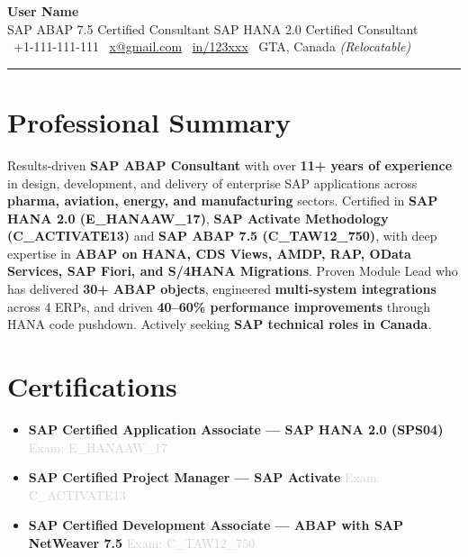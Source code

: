 \documentclass[10pt, a4paper]{article}
\makeatletter
\newcommand{\UserName}{User Name}
\newcommand{\UserMobile}{+1-111-111-111}
\newcommand{\UserEmailID}{x@gmail.com}
\newcommand{\UserLinkedIn}{\href{https://www.linkedin.com/in/123xxx}{in/123xxx}}
\makeatother
\begin{document}
\begin{center}
  {\LARGE\bfseries \UserName{}}\\[5pt]
  {\large\color{accentblue}
    SAP ABAP 7.5 Certified Consultant \quad\textbar\quad
    SAP HANA 2.0 Certified Consultant
  }\\[6pt]
  \textcolor{iconcolor}{%
    \faPhone*\ \UserMobile{} \quad\textbar\quad
    \faEnvelope\ \href{mailto:\UserEmailID{}}{\UserEmailID{}} \quad\textbar\quad
    \faLinkedin\ \UserLinkedIn{} \quad\textbar\quad
    \faMapPin\ GTA, Canada \textit{(Relocatable)}
  }
\end{center}
\vspace{2pt}\rule{\linewidth}{1.2pt}\vspace{4pt}

\section{Professional Summary}
Results-driven \textbf{SAP ABAP Consultant} with over \textbf{11+ years of experience}
in design, development, and delivery of enterprise SAP applications across
\textbf{pharma, aviation, energy, and manufacturing} sectors. Certified in
\textbf{SAP HANA 2.0 (E\_HANAAW\_17)}, \textbf{SAP Activate Methodology (C\_ACTIVATE13)} and
\textbf{SAP ABAP 7.5 (C\_TAW12\_750)}, with deep expertise in
\textbf{ABAP on HANA, CDS Views, AMDP, RAP, OData Services,
SAP Fiori, and S/4HANA Migrations}. Proven Module Lead who has delivered
\textbf{30+ ABAP objects}, engineered \textbf{multi-system integrations} across
4 ERPs, and driven \textbf{40--60\% performance improvements} through HANA code
pushdown. Actively seeking \textbf{SAP technical roles in Canada}.

\section{Certifications}
\begin{itemize}
  \item \textbf{SAP Certified Application Associate --- SAP HANA 2.0 (SPS04)}
        \hfill \textcolor{lightgray}{\small Exam: E\_HANAAW\_17}
  \item \textbf{SAP Certified Project Manager --- SAP Activate}
        \hfill \textcolor{lightgray}{\small Exam: C\_ACTIVATE13}
  \item \textbf{SAP Certified Development Associate --- ABAP with SAP NetWeaver 7.5}
        \hfill \textcolor{lightgray}{\small Exam: C\_TAW12\_750}
\end{itemize}
\end{document}
